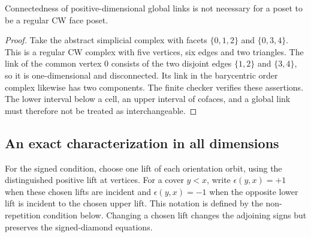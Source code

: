 \begin{counterexample}
\label{SA21-C07}
Connectedness of positive-dimensional global links is not necessary for
a poset to be a regular CW face poset.
\end{counterexample}
\begin{proof}
Take the abstract simplicial complex with facets $\{0,1,2\}$ and
$\{0,3,4\}$. This is a regular CW complex with five vertices, six edges
and two triangles. The link of the common vertex $0$ consists of the
two disjoint edges $\{1,2\}$ and $\{3,4\}$, so it is one-dimensional
and disconnected. Its link in the barycentric order complex likewise
has two components. The finite checker verifies these assertions.
The lower interval below a cell, an upper interval of cofaces, and a
global link must therefore not be treated as interchangeable.
\end{proof}

\subsection{An exact characterization in all dimensions}

For the signed condition, choose one lift of each orientation orbit,
using the distinguished positive lift at vertices. For a cover $y<x$,
write $\epsilon(y,x)=+1$ when these chosen lifts are incident and
$\epsilon(y,x)=-1$ when the opposite lower lift is incident to the
chosen upper lift. This notation is defined by the non-repetition
condition below. Changing a chosen lift changes the adjoining signs
but preserves the signed-diamond equations.

